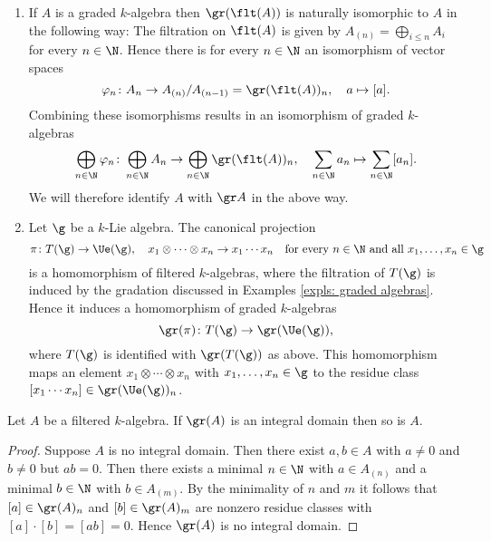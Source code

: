 \begin{examples}
 \begin{enumerate}[leftmargin=*]
  \item
   If $A$ is a graded $k$-algebra then $\gr(\flt(A))$ is naturally isomorphic to $A$ in the following way: The filtration on $\flt(A)$ is given by $A_{(n)} = \bigoplus_{i \leq n} A_i$ for every $n \in \N$. Hence there is for every $n \in \N$ an isomorphism of vector spaces
   \[
    \varphi_n \colon A_n \to A_{(n)}/A_{(n-1)} = \gr(\flt(A))_n, \quad a \mapsto [a].
   \]
   Combining these isomorphisms results in an isomorphism of graded $k$-algebras
   \[
    \bigoplus_{n \in \N} \varphi_n \colon
    \bigoplus_{n \in \N} A_n \to \bigoplus_{n \in \N} \gr(\flt(A))_n, \quad
    \sum_{n \in \N} a_n \mapsto \sum_{n \in \N} [a_n].
   \]
   We will therefore identify $A$ with $\gr A$ in the above way.
  \item
   Let $\g$ be a $k$-Lie algebra. The canonical projection
   \[
    \pi \colon T(\g) \to \Ue(\g), \quad x_1 \otimes \dotsb \otimes x_n \to x_1 \dotsm x_n
    \quad \text{for every $n \in \N$ and all $x_1, \dotsc, x_n \in \g$}
   \]
   is a homomorphism of filtered $k$-algebras, where the filtration of $T(\g)$ is induced by the gradation discussed in Examples \ref{expls: graded algebras}. Hence it induces a homomorphism of graded $k$-algebras
   \[
    \gr(\pi) \colon T(\g) \to \gr(\Ue(\g)),
   \]
   where $T(\g)$ is identified with $\gr(T(\g))$ as above. This homomorphism maps an element $x_1 \otimes \dotsb \otimes x_n$ with $x_1, \dots, x_n \in \g$ to the residue class $[x_1 \dotsm x_n] \in \gr(\Ue(\g))_n$.
 \end{enumerate}
\end{examples}


\begin{proposition}\label{prop: associated graded algebra and zero divisors}
 Let $A$ be a filtered $k$-algebra. If $\gr(A)$ is an integral domain then so is $A$.
\end{proposition}
\begin{proof}
 Suppose $A$ is no integral domain. Then there exist $a,b \in A$ with $a \neq 0$ and $b \neq 0$ but $ab = 0$. Then there exists a minimal $n \in \N$ with $a \in A_{(n)}$ and a minimal $b \in \N$ with $b \in A_{(m)}$. By the minimality of $n$ and $m$ it follows that $[a] \in \gr(A)_n$ and $[b] \in \gr(A)_m$ are nonzero residue classes with $[a] \cdot [b] = [ab] = 0$. Hence $\gr(A)$ is no integral domain.
\end{proof}


